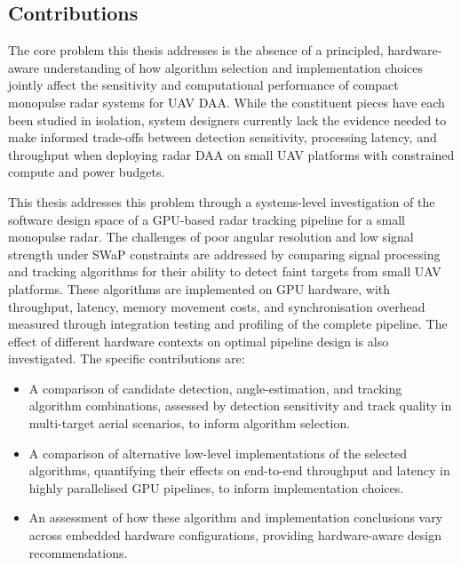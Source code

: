 \subsection{Contributions}

The core problem this thesis addresses is the absence of a principled, 
hardware-aware understanding of how algorithm selection and implementation 
choices jointly affect the sensitivity and computational performance of compact 
monopulse radar systems for UAV DAA. While the constituent pieces have each 
been studied in isolation, system designers currently lack the evidence needed 
to make informed trade-offs between detection sensitivity, processing latency, 
and throughput when deploying radar DAA on small UAV platforms with constrained 
compute and power budgets.

This thesis addresses this problem through a systems-level investigation of the 
software design space of a GPU-based radar tracking pipeline for a small 
monopulse radar. The challenges of poor angular resolution and low signal 
strength under SWaP constraints are addressed by comparing signal processing 
and tracking algorithms for their ability to detect faint targets from small 
UAV platforms. These algorithms are implemented on GPU hardware, with 
throughput, latency, memory movement costs, and synchronisation overhead 
measured through integration testing and profiling of the complete pipeline. 
The effect of different hardware contexts on optimal pipeline design is also 
investigated. The specific contributions are:

\begin{itemize}
    \item A comparison of candidate detection, angle-estimation, and tracking 
    algorithm combinations, assessed by detection sensitivity and track quality 
    in multi-target aerial scenarios, to inform algorithm selection.
    \item A comparison of alternative low-level implementations of the selected 
    algorithms, quantifying their effects on end-to-end throughput and latency 
    in highly parallelised GPU pipelines, to inform implementation choices.
    \item An assessment of how these algorithm and implementation conclusions 
    vary across embedded hardware configurations, providing hardware-aware 
    design recommendations.
\end{itemize}